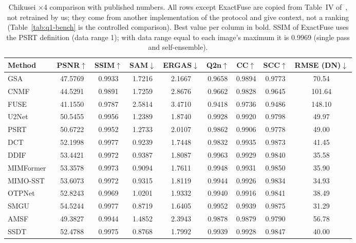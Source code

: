 \documentclass[journal]{IEEEtran}
\begin{document}
\begin{table}[t]
\centering
\caption{Chikusei $\times$4 comparison with published numbers. All rows except ExactFuse are copied from Table~IV of~\cite{chen2026twostage}, not retrained by us; they come from another implementation of the protocol and give context, not a ranking (Table~\ref{tab:q1-bench} is the controlled comparison). Best value per column in bold. SSIM of ExactFuse uses the PSRT definition (data range 1); with data range equal to each image's maximum it is 0.9969 (single pass and self-ensemble).}
\label{tab:main}
\begin{tabular}{@{}lcccccccc@{}}
\toprule
Method & PSNR$\uparrow$ & SSIM$\uparrow$ & SAM$\downarrow$ & ERGAS$\downarrow$ & Q2n$\uparrow$ & CC$\uparrow$ & SCC$\uparrow$ & RMSE (DN)$\downarrow$ \\
\midrule
GSA~\cite{aiazzi2007gsa} & 47.5769 & 0.9933 & 1.7216 & 2.1667 & 0.9658 & 0.9894 & 0.9773 & 70.54 \\
CNMF~\cite{yokoya2012cnmf} & 44.5291 & 0.9891 & 1.7259 & 2.8676 & 0.9662 & 0.9828 & 0.9645 & 101.64 \\
FUSE~\cite{wei2015fuse} & 41.1550 & 0.9787 & 2.5814 & 3.4710 & 0.9418 & 0.9736 & 0.9486 & 148.10 \\
U2Net~\cite{peng2023u2net} & 50.5455 & 0.9956 & 1.2389 & 1.8740 & 0.9928 & 0.9920 & 0.9798 & 49.97 \\
PSRT~\cite{deng2023psrt} & 50.6722 & 0.9952 & 1.2733 & 2.0107 & 0.9862 & 0.9906 & 0.9778 & 49.00 \\
DCT~\cite{ma2024reciprocal} & 52.1998 & 0.9977 & 0.9239 & 1.7448 & 0.9832 & 0.9935 & 0.9873 & 41.45 \\
DDIF~\cite{cao2024ddif} & 53.4421 & 0.9972 & 0.9387 & 1.8087 & 0.9963 & 0.9929 & 0.9840 & 35.58 \\
MIMFormer~\cite{li2024mimformer} & 53.3578 & 0.9973 & 0.9094 & 1.7611 & 0.9948 & 0.9931 & 0.9850 & 35.90 \\
MIMO-SST~\cite{fang2024mimosst} & 53.6073 & 0.9972 & 0.9315 & 1.8119 & 0.9944 & 0.9926 & 0.9834 & 34.93 \\
OTPNet~\cite{yu2025otpnet} & 52.8243 & 0.9969 & 1.0201 & 1.9332 & 0.9940 & 0.9916 & 0.9841 & 38.49 \\
SMGU~\cite{yan2025smgu} & 54.5244 & 0.9977 & 0.8719 & 1.6405 & 0.9952 & 0.9939 & 0.9875 & 31.29 \\
AMSF~\cite{liu2025amsf} & 49.3827 & 0.9944 & 1.4852 & 2.3943 & 0.9878 & 0.9879 & 0.9790 & 56.78 \\
SSDT~\cite{fu2025ssdt} & 52.4788 & 0.9975 & 0.8768 & 1.7992 & 0.9939 & 0.9928 & 0.9847 & 40.00 \\

\end{tabular}
\end{table}
\end{document}
